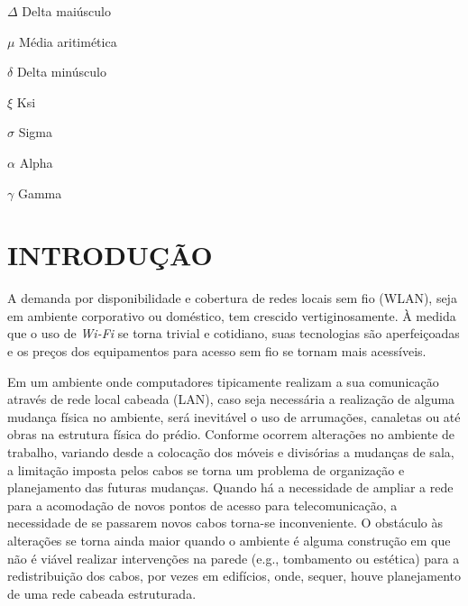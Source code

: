 \documentclass[
	12pt,				%
	openright,			%
	twoside,			%
	a4paper,			%
	english,			%
	french,				%
	spanish,			%
	brazil				%
	]{abntex2}
\begin{document}
\begin{simbolos}
  \item[$ \Delta $] Delta maiúsculo
  \item[$ \mu $] Média aritimética
  \item[$ \delta $] Delta minúsculo
  \item[$ \xi $] Ksi
  \item[$ \sigma $] Sigma
  \item[$ \alpha $] Alpha
  \item[$ \gamma $] Gamma
\end{simbolos}

\tableofcontents*
\cleardoublepage

\textual
\chapter[INTRODUÇÃO]{INTRODUÇÃO}

A demanda por disponibilidade e cobertura de redes locais sem fio (WLAN), seja em ambiente corporativo ou doméstico, tem crescido vertiginosamente. À medida que o uso de \textit{Wi-Fi} se torna trivial e cotidiano, suas tecnologias são aperfeiçoadas e os preços dos equipamentos para acesso sem fio se tornam mais acessíveis.

Em um ambiente onde computadores tipicamente realizam a sua comunicação através de rede local cabeada (LAN), caso seja necessária a realização de alguma mudança física no ambiente, será inevitável o uso de arrumações, canaletas ou até obras na estrutura física do prédio. Conforme ocorrem alterações no ambiente de trabalho, variando desde a colocação dos móveis e divisórias a mudanças de sala, a limitação imposta pelos cabos se torna um problema de organização e planejamento das futuras mudanças. Quando há a necessidade de ampliar a rede para a acomodação de novos pontos de acesso para telecomunicação, a necessidade de se passarem novos cabos torna-se inconveniente. O obstáculo às alterações se torna ainda maior quando o ambiente é alguma construção em que não é viável realizar intervenções na parede (e.g., tombamento ou estética) para a redistribuição dos cabos, por vezes em edifícios, onde, sequer, houve planejamento de uma rede cabeada estruturada.
\end{document}
